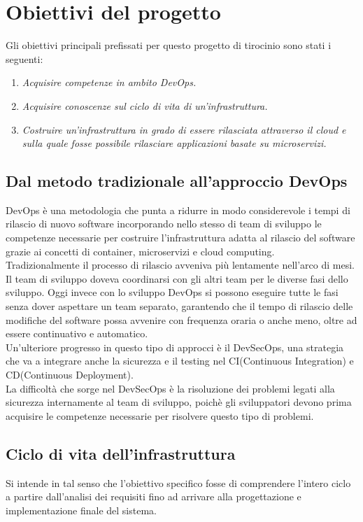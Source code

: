 \documentclass[a4paper,12pt]{report}
\begin{document}
\section{Obiettivi del progetto}
Gli obiettivi principali prefissati per questo progetto di tirocinio sono stati i seguenti:
\begin{enumerate}
\item \textit{Acquisire competenze in ambito DevOps.}
\item \textit{Acquisire conoscenze sul ciclo di vita di un'infrastruttura.}
\item \textit{Costruire un'infrastruttura in grado di essere rilasciata attraverso il cloud e sulla quale fosse possibile rilasciare applicazioni basate su microservizi.}
\end{enumerate}
\subsection{Dal metodo tradizionale all'approccio DevOps}
DevOps è una metodologia che punta a ridurre in modo considerevole i tempi di rilascio di nuovo software incorporando nello stesso di team di sviluppo le competenze necessarie per costruire l'infrastruttura adatta al rilascio del software grazie ai concetti di container, microservizi e cloud computing.\\
Tradizionalmente il processo di rilascio avveniva più lentamente nell'arco di mesi. Il team di sviluppo doveva coordinarsi con gli altri team per le diverse fasi dello sviluppo. Oggi invece con lo sviluppo DevOps si possono eseguire tutte le fasi senza dover aspettare un team separato, garantendo che il tempo di rilascio delle modifiche del software possa avvenire con frequenza oraria o anche meno, oltre ad essere continuativo e automatico.\\
Un'ulteriore progresso in questo tipo di approcci è il DevSecOps, una strategia che va a integrare anche la sicurezza e il testing nel CI(Continuous Integration) e CD(Continuous Deployment). \\La difficoltà che sorge nel DevSecOps è la risoluzione dei problemi legati alla sicurezza internamente al team di sviluppo, poichè gli sviluppatori devono prima acquisire le competenze necessarie per risolvere questo tipo di problemi.
\subsection{Ciclo di vita dell'infrastruttura}
Si intende in tal senso che l'obiettivo specifico fosse di comprendere l'intero ciclo a partire dall'analisi dei requisiti fino ad arrivare alla progettazione e implementazione finale del sistema.
\end{document}
